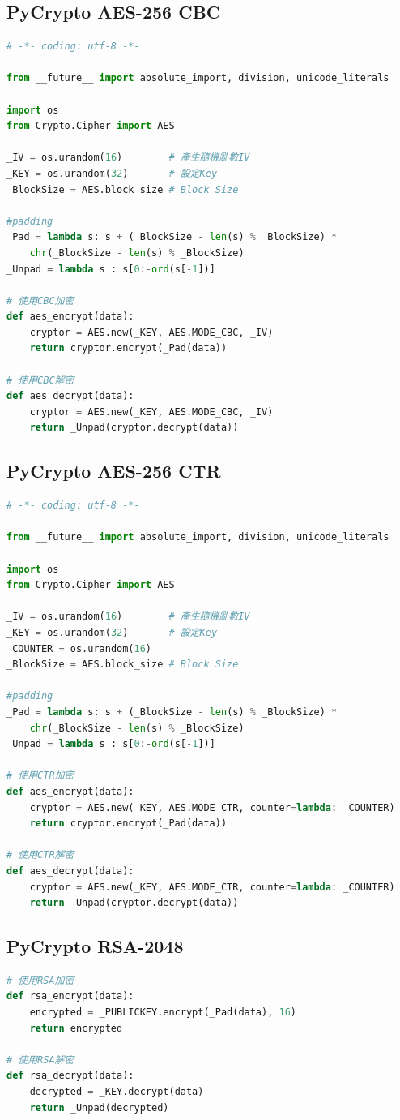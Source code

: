 \documentclass[12pt,a4paper]{article}
\begin{document}
\subsection{PyCrypto AES-256 CBC}
{
\begin{lstlisting}[language=Python]
# -*- coding: utf-8 -*-

from __future__ import absolute_import, division, unicode_literals

import os
from Crypto.Cipher import AES

_IV = os.urandom(16)		# 產生隨機亂數IV
_KEY = os.urandom(32)		# 設定Key
_BlockSize = AES.block_size	# Block Size

#padding
_Pad = lambda s: s + (_BlockSize - len(s) % _BlockSize) * 
	chr(_BlockSize - len(s) % _BlockSize)
_Unpad = lambda s : s[0:-ord(s[-1])]

# 使用CBC加密
def aes_encrypt(data):
    cryptor = AES.new(_KEY, AES.MODE_CBC, _IV)
    return cryptor.encrypt(_Pad(data))

# 使用CBC解密
def aes_decrypt(data):
    cryptor = AES.new(_KEY, AES.MODE_CBC, _IV)
    return _Unpad(cryptor.decrypt(data))
\end{lstlisting}
}

\subsection{PyCrypto AES-256 CTR}
{
\begin{lstlisting}[language=Python]
# -*- coding: utf-8 -*-

from __future__ import absolute_import, division, unicode_literals

import os
from Crypto.Cipher import AES

_IV = os.urandom(16)		# 產生隨機亂數IV
_KEY = os.urandom(32)		# 設定Key
_COUNTER = os.urandom(16)
_BlockSize = AES.block_size # Block Size

#padding
_Pad = lambda s: s + (_BlockSize - len(s) % _BlockSize) * 
	chr(_BlockSize - len(s) % _BlockSize)
_Unpad = lambda s : s[0:-ord(s[-1])]

# 使用CTR加密
def aes_encrypt(data):
    cryptor = AES.new(_KEY, AES.MODE_CTR, counter=lambda: _COUNTER)
    return cryptor.encrypt(_Pad(data))

# 使用CTR解密
def aes_decrypt(data):
    cryptor = AES.new(_KEY, AES.MODE_CTR, counter=lambda: _COUNTER)
    return _Unpad(cryptor.decrypt(data))
\end{lstlisting}
}

\subsection{PyCrypto RSA-2048}
{
\begin{lstlisting}[language=Python]
# 使用RSA加密
def rsa_encrypt(data):
    encrypted = _PUBLICKEY.encrypt(_Pad(data), 16)
    return encrypted

# 使用RSA解密
def rsa_decrypt(data):
    decrypted = _KEY.decrypt(data)
    return _Unpad(decrypted)	
\end{lstlisting}
}
\end{document}
